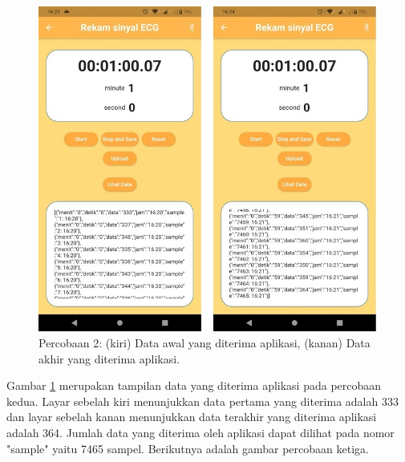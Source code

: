 \begin{figure}[H] \centering
	\includegraphics[width=1\textwidth]{img/percob/Slide12}
	\caption{Percobaan 2: (kiri) Data awal yang diterima aplikasi, (kanan) Data akhir yang diterima aplikasi.}
	\label{fig:4.2.2}
\end{figure}
\vspace{1ex}
Gambar \ref{fig:4.2.2} merupakan tampilan data yang diterima aplikasi pada percobaan kedua. Layar sebelah kiri menunjukkan data pertama yang diterima adalah 333 dan layar sebelah kanan menunjukkan data terakhir yang diterima aplikasi adalah 364. Jumlah data yang diterima oleh aplikasi dapat dilihat pada nomor "sample" yaitu 7465 sampel. Berikutnya adalah gambar percobaan ketiga. 

